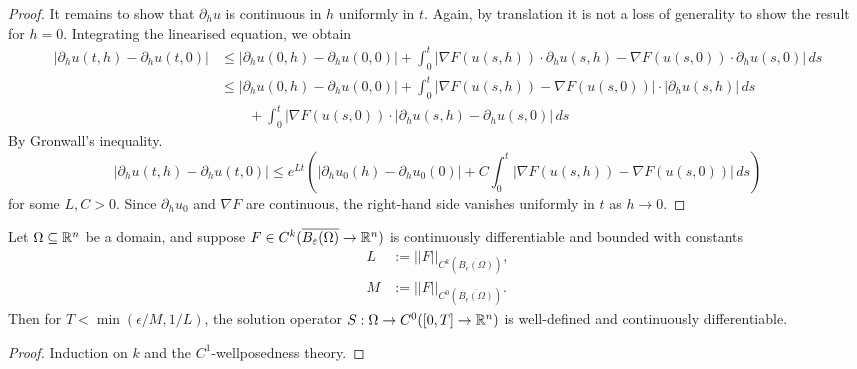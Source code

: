 \begin{proof}
	It remains to show that $\partial_h u$ is continuous in $h$ uniformly in $t$. Again, by translation it is not a loss of generality to show the result for $h = 0$. Integrating the linearised equation, we obtain
		\begin{align*}
			|\partial_h u (t, h) - \partial_h u (t, 0)|
				&\leq |\partial_h u(0, h) - \partial_h u (0, 0)| + \int_0^t |\nabla F (u(s, h)) \cdot \partial_h u (s, h) - \nabla F(u(s, 0)) \cdot \partial_h u(s, 0)| \, ds\\
				&\leq |\partial_h u(0, h) - \partial_h u (0, 0)| + \int_0^t |\nabla F (u(s, h)) - \nabla F(u(s, 0))|  \cdot |\partial_h u(s, h)| \, ds \\
				&\qquad+ \int_0^t |\nabla F(u(s, 0)) \cdot | \partial_h u(s, h) - \partial_h u(s, 0)| \, ds
		\end{align*}
	By Gronwall's inequality.
		\[ |\partial_h u (t, h) - \partial_h u (t, 0)| \leq e^{L t} \left( |\partial_h u_0 (h) - \partial_h u_0 (0)| + C \int_0^t   |\nabla F (u(s, h)) - \nabla F(u(s, 0))| \, ds \right) \]	
	for some $L, C > 0$. Since $\partial_h u_0$ and $\nabla F$ are continuous, the right-hand side vanishes uniformly in $t$ as $h \to 0$. 	
\end{proof}

\begin{corollary}
	Let $\Omega \subseteq \mathbb R^n$ be a domain, and suppose $F \in C^{k}(\overline{B_\varepsilon (\Omega)} \to \mathbb R^n)$ is continuously differentiable and bounded with constants
		\begin{align*}
			L &:= ||F||_{C^{k} (\overline{B_\epsilon (\Omega)})}, \\
			M &:= ||F||_{C^{0} (\overline{B_\epsilon (\Omega)})}.
		\end{align*}
	Then for $T< \min (\epsilon/M, 1/L)$, the solution operator $S : \Omega \to C^0 ([0, T] \to \mathbb R^n)$	 is well-defined and continuously differentiable.
\end{corollary}

\begin{proof}
	Induction on $k$ and the $C^1$-wellposedness theory. 
\end{proof}